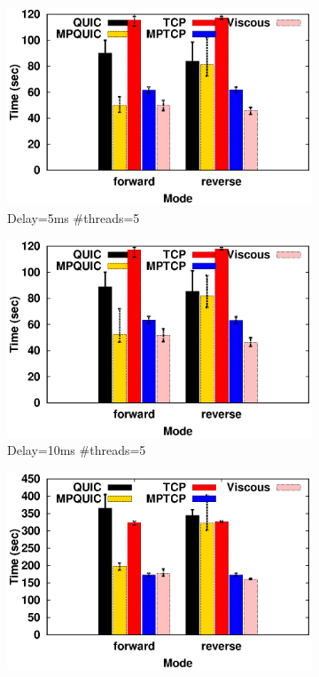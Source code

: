 
\begin{figure}[h]
	\begin{center}
		
		\begin{subfigure}{.49\linewidth}
			\includegraphics[width=0.95\linewidth]{img/rocketfuel/tymdiff-5-5.eps}
			\caption{\label{fig:rocketfuel_time_5_20}Delay=5ms \#threads=5}
		\end{subfigure}
		\begin{subfigure}{.49\linewidth}
			\includegraphics[width=0.95\linewidth]{img/rocketfuel/tymdiff-10-5.eps}
			\caption{\label{fig:rocketfuel_time_10_5}Delay=10ms \#threads=5}
		\end{subfigure}
		\begin{subfigure}{.49\linewidth}
			\includegraphics[width=0.95\linewidth]{img/rocketfuel/tymdiff-10-20.eps}

\end{subfigure}
\end{center}
\end{figure}
